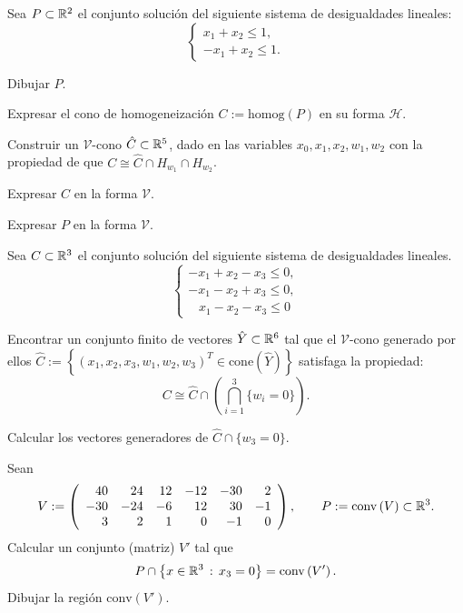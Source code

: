 \documentclass[a4paper,12pt]{article}
\renewcommand{\conv}[1]{\mathrm{conv}\left(#1\right)}
\renewcommand{\cone}[1]{\mathrm{cone}\left(#1\right)}
\newcommand{\homog}[1]{\mathrm{homog}\left(#1\right)}
\newcommand{\HH}{\mathcal{H}}
\newcommand{\VV}{\mathcal{V}}
\begin{document}
\begin{exerciselist}
  \item Sea $P \subset \mathbb{R}^2$ el conjunto solución del siguiente sistema de desigualdades lineales:
  $$
  \left\{
  \begin{array}{l}
  x_1 + x_2 \leq 1,\\
  - x_1 + x_2 \leq 1.
  \end{array}
  \right.
  $$
  \begin{exerciselist}
    \item Dibujar $P$.
    \item Expresar el cono de homogeneización $C:=\homog{P}$ en su forma $\HH$.
    \item Construir un $\VV$-cono $\hat{C} \subset \mathbb{R}^5$, dado en las variables $x_0, x_1, x_2, w_1, w_2$ 
    con la propiedad de que $C \cong \hat{C} \cap H_{w_1} \cap H_{w_2}$.
    \item Expresar $C$ en la forma $\VV$.
    \item Expresar $P$ en la forma $\VV$.
  \end{exerciselist}

  \item
  Sea $C \subset \mathbb{R}^3$ el conjunto solución del siguiente sistema de desigualdades lineales.
  $$
  \left\{
  \begin{array}{l}
  - x_1 + x_2 - x_3 \leq 0,\\
  - x_1 - x_2 + x_3 \leq 0,\\
   \,\,\,\,\, x_1 - x_2 - x_3 \leq 0
  \end{array}
  \right.
  $$

  \begin{exerciselist}
  \item Encontrar un conjunto finito de vectores $\hat{Y} \subset \mathbb{R}^6$ tal que el
  $\mathcal{V}$-cono generado por ellos $\hat{C}:= \left\{ (x_1, x_2, x_3, w_1, w_2, w_3)^T \in \cone{\hat{Y}} \right\}$ satisfaga la propiedad:
  $$
  C \cong \hat{C} \cap \left( \bigcap_{i=1}^3 \{ w_i = 0 \} \right).
  $$
  \item Calcular los vectores generadores de $\hat{C} \cap \{w_3 = 0 \}$.
  \end{exerciselist}

  \item Sean
  $$
  V:= \left(
  \begin{array}{rrrrrr}
  40  & 24  & 12 & -12 & -30 & 2\\
  -30 & -24 & -6 &   12 &  30 & -1\\
  3    & 2    &  1 &  0  &  -1   & 0
  \end{array}
  \right), \qquad
  P:= \conv{V} \subset \RR^3.
  $$
  Calcular un conjunto (matriz) $V'$ tal que
  $$
  P \cap \setof{x \in \RR^3}{x_3 = 0} = \conv{V'}.
  $$
  Dibujar la región $\conv{V'}$.


\end{exerciselist}
\end{document}
